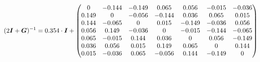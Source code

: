 \begin{equation*}
    (2\bm{I} + \bm{G})^{-1} = 0.354 \cdot \bm{I} + \begin{pmatrix}
        0     & -0.144 & -0.149 & 0.065  & 0.056  & -0.015 & -0.036 \\
        0.149 & 0      & -0.056 & -0.144 & 0.036  & 0.065  & 0.015  \\
        0.144 & -0.065 & 0      & 0.015  & -0.149 & -0.036 & 0.056  \\
        0.056 & 0.149  & -0.036 & 0      & -0.015 & -0.144 & -0.065 \\
        0.065 & -0.015 & 0.144  & 0.036  & 0      & 0.056  & -0.149 \\
        0.036 & 0.056  & 0.015  & 0.149  & 0.065  & 0      & 0.144  \\
        0.015 & -0.036 & 0.065  & -0.056 & 0.144  & -0.149 & 0      \\
    \end{pmatrix}
\end{equation*}
